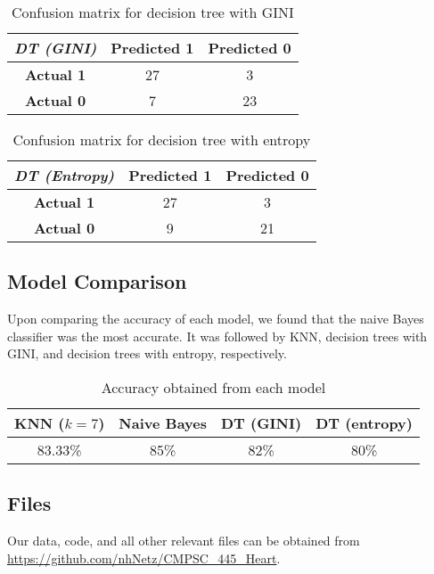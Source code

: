 \documentclass{article}
\begin{document}
\begin{table}[!h]
\centering
\begin{tabular}[h]{ |c|c|c| } 
 \hline
 \textit{DT (GINI)} & \textbf{Predicted 1} & \textbf{Predicted 0} \\ 
\hline
 \textbf{Actual 1} & 27 & 3 \\ 
\hline
 \textbf{Actual 0} & 7 & 23 \\ 
 \hline
\end{tabular}
\caption{Confusion matrix for decision tree with GINI}
\end{table}


\begin{table}[!h]
\centering
\begin{tabular}[h]{ |c|c|c| } 
 \hline
 \textit{DT (Entropy)} & \textbf{Predicted 1} & \textbf{Predicted 0} \\ 
\hline
 \textbf{Actual 1} & 27 & 3 \\ 
\hline
 \textbf{Actual 0} & 9 & 21 \\ 
 \hline
\end{tabular}
\caption{Confusion matrix for decision tree with entropy}
\end{table}


\subsection{Model Comparison}
Upon comparing the accuracy of each model, we found that the naive Bayes classifier was the most accurate. It was followed by KNN, decision trees with GINI, and decision trees with entropy, respectively.

\begin{table}[!h]
\centering
\begin{tabular}[h]{ |c|c|c|c| } 
 \hline
 \textbf{KNN ($k=7$)} & \textbf{Naive Bayes} & \textbf{DT (GINI)} & \textbf{DT (entropy)} \\ 
\hline
 83.33\% & 85\% & 82\% & 80\% \\ 
 \hline
\end{tabular}
\caption{Accuracy obtained from each model}
\end{table}

\subsection{Files}
Our data, code, and all other relevant files can be obtained from \url{https://github.com/nhNetz/CMPSC_445_Heart}.
\end{document}
